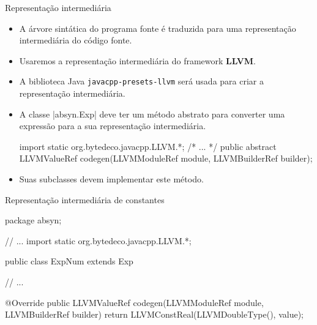 \begin{frame}{Representação intermediária}
  \begin{itemize}
    \item A árvore sintática do programa fonte é traduzida para uma
    representação intermediária do código fonte.
    \item Usaremos a representação intermediária do framework
    \textbf{LLVM}.
    \item A biblioteca Java \texttt{javacpp-presets-llvm} será usada
    para criar a representação intermediária.
    \item A classe \pyginline|absyn.Exp| deve ter um método abstrato
    para converter uma expressão para a sua representação
    intermediária.
\begin{pygmented}[]
import static org.bytedeco.javacpp.LLVM.*;
/* ... */
public abstract LLVMValueRef codegen(LLVMModuleRef module,
                                     LLVMBuilderRef builder);
\end{pygmented}
    \item Suas subclasses devem implementar este método.
  \end{itemize}
\end{frame}

\begin{frame}{Representação intermediária de constantes}
\begin{pygmented}[]
package absyn;

// ...
import static org.bytedeco.javacpp.LLVM.*;

public class ExpNum extends Exp {
   // ...

   @Override
   public LLVMValueRef codegen(LLVMModuleRef module,
                               LLVMBuilderRef builder) {
      return LLVMConstReal(LLVMDoubleType(), value);
   }
}
\end{pygmented}
\end{frame}

